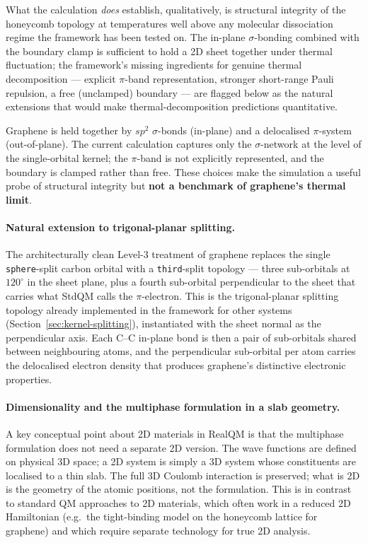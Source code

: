 What the calculation \emph{does} establish, qualitatively, is structural integrity of the honeycomb topology at temperatures well above any molecular dissociation regime the framework has been tested on. The in-plane $\sigma$-bonding combined with the boundary clamp is sufficient to hold a 2D sheet together under thermal fluctuation; the framework's missing ingredients for genuine thermal decomposition --- explicit $\pi$-band representation, stronger short-range Pauli repulsion, a free (unclamped) boundary --- are flagged below as the natural extensions that would make thermal-decomposition predictions quantitative.

Graphene is held together by $sp^2$ $\sigma$-bonds (in-plane) and a delocalised $\pi$-system (out-of-plane). The current calculation captures only the $\sigma$-network at the level of the single-orbital kernel; the $\pi$-band is not explicitly represented, and the boundary is clamped rather than free. These choices make the simulation a useful probe of structural integrity but \textbf{not a benchmark of graphene's thermal limit}.

\paragraph{Natural extension to trigonal-planar splitting.}
The architecturally clean Level-3 treatment of graphene replaces the single \texttt{sphere}-split carbon orbital with a \texttt{third}-split topology --- three sub-orbitals at $120^\circ$ in the sheet plane, plus a fourth sub-orbital perpendicular to the sheet that carries what StdQM calls the $\pi$-electron. This is the trigonal-planar splitting topology already implemented in the framework for other systems (Section~\ref{sec:kernel-splitting}), instantiated with the sheet normal as the perpendicular axis. Each C--C in-plane bond is then a pair of sub-orbitals shared between neighbouring atoms, and the perpendicular sub-orbital per atom carries the delocalised electron density that produces graphene's distinctive electronic properties.

\paragraph{Dimensionality and the multiphase formulation in a slab geometry.}
A key conceptual point about 2D materials in RealQM is that the multiphase formulation does not need a separate 2D version. The wave functions are defined on physical 3D space; a 2D system is simply a 3D system whose constituents are localised to a thin slab. The full 3D Coulomb interaction is preserved; what is 2D is the geometry of the atomic positions, not the formulation. This is in contrast to standard QM approaches to 2D materials, which often work in a reduced 2D Hamiltonian (e.g.\ the tight-binding model on the honeycomb lattice for graphene) and which require separate technology for true 2D analysis.

